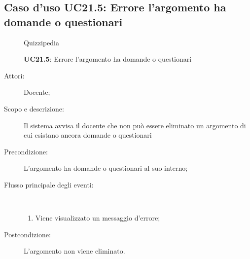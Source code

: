 \subsection{Caso d'uso UC21.5: Errore l'argomento ha domande o questionari}
	\begin{figure}[H]
		\centering
		\begin{resizedtikzpicture}{\textwidth}
		\begin{umlsystem}[x=0, fill=lightgray!20]{Quizzipedia}
		\end{umlsystem}
		\end{resizedtikzpicture}
		\caption{\textbf{UC21.5}: Errore l'argomento ha domande o questionari}
		\label{UC21.5}
	\end{figure}
\begin{description}
\item[Attori:] Docente;
\item[Scopo e descrizione:] Il sistema avvisa il docente che non può essere eliminato un argomento di cui esistano ancora domande o questionari
      \item[Precondizione:] L'argomento ha domande o questionari al suo interno;

        \item[Flusso principale degli eventi:] \ 
 \begin{enumerate}
          \item Viene visualizzato un messaggio d'errore;

      \end{enumerate}
    \item[Postcondizione:] L'argomento non viene eliminato.
  \end{description}
\hypertarget{UC22}{}

